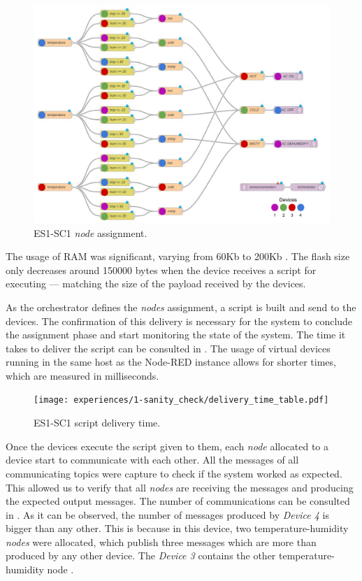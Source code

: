 \begin{figure}[h]
\centering
\includegraphics[width=\linewidth]{thesis/figures/experiences/1-sanity_check/node-assignment-visual.pdf}
\caption[ES1-SC1 \textit{node} assignment.]{ES1-SC1 \textit{node} assignment.}\label{fig:sanity_check_node_assignment_visual}
\end{figure}

The usage of RAM was significant, varying from 60Kb to 200Kb . The flash size only decreases around 150000 bytes when the device receives a script for executing --- matching the size of the payload received by the devices.

As the orchestrator defines the \textit{nodes} assignment, a script is built and send to the devices. The confirmation of this delivery is necessary for the system to conclude the assignment phase and start monitoring the state of the system. The time it takes to deliver the script can be consulted in . The usage of virtual devices running in the same host as the Node-RED instance allows for shorter times, which are measured in milliseconds.

\begin{figure}[h]
\centering
\texttt{[image: experiences/1-sanity\_check/delivery\_time\_table.pdf]}
\caption[ES1-SC1 script delivery time.]{ES1-SC1 script delivery time.}\label{fig:sanity_check_delivery_time}
\end{figure}

Once the devices execute the script given to them, each \textit{node} allocated to a device start to communicate with each other. All the messages of all communicating topics were capture to check if the system worked as expected. This allowed us to verify that all \textit{nodes} are receiving the messages and producing the expected output messages. The number of communications can be consulted in . As it can be observed, the number of messages produced by \textit{Device 4} is bigger than any other. This is because in this device, two temperature-humidity \textit{nodes} were allocated, which publish three messages which are more than produced by any other device. The \textit{Device 3} contains the other temperature-humidity node .

